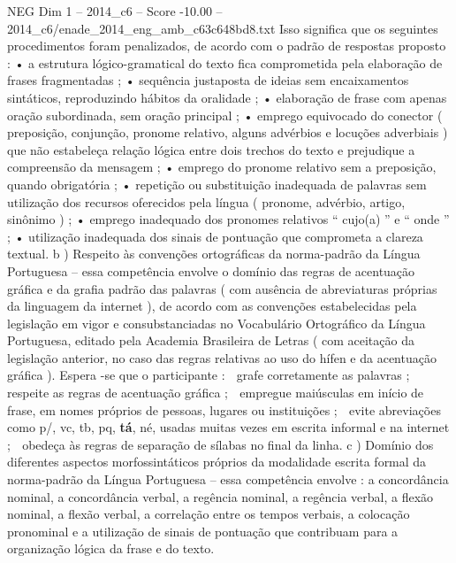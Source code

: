\begin{textsample}{NEG Dim 1 – 2014\_c6 – Score -10.00 – 2014\_c6/enade\_2014\_eng\_amb\_c63c648bd8.txt}
Isso significa que os seguintes procedimentos foram penalizados, de acordo com o padrão de respostas proposto : • a estrutura lógico-gramatical do texto fica comprometida pela elaboração de frases fragmentadas ; • sequência justaposta de ideias sem encaixamentos sintáticos, reproduzindo hábitos da oralidade ; • elaboração de frase com apenas oração subordinada, sem oração principal ; • emprego equivocado do conector ( preposição, conjunção, pronome relativo, alguns advérbios e locuções adverbiais ) que não estabeleça relação lógica entre dois trechos do texto e prejudique a compreensão da mensagem ; • emprego do pronome relativo sem a preposição, quando obrigatória ; • repetição ou substituição inadequada de palavras sem utilização dos recursos oferecidos pela língua ( pronome, advérbio, artigo, sinônimo ) ; • emprego inadequado dos pronomes relativos “ cujo(a) ” e “ onde ” ; • utilização inadequada dos sinais de pontuação que comprometa a clareza textual. b ) Respeito às convenções ortográficas da norma-padrão da Língua Portuguesa – essa competência envolve o domínio das regras de acentuação gráfica e da grafia padrão das palavras ( com ausência de abreviaturas próprias da linguagem da internet ), de acordo com as convenções estabelecidas pela legislação em vigor e consubstanciadas no Vocabulário Ortográfico da Língua Portuguesa, editado pela Academia Brasileira de Letras ( com aceitação da legislação anterior, no caso das regras relativas ao uso do hífen e da acentuação gráfica ).
Espera -se que o participante :  grafe corretamente as palavras ;  respeite as regras de acentuação gráfica ;  empregue maiúsculas em início de frase, em nomes próprios de pessoas, lugares ou instituições ;  evite abreviações como p/, vc, tb, pq, \textbf{tá}, né, usadas muitas vezes em escrita informal e na internet ;  obedeça às regras de separação de sílabas no final da linha. c ) Domínio dos diferentes aspectos morfossintáticos próprios da modalidade escrita formal da norma-padrão da Língua Portuguesa – essa competência envolve : a concordância nominal, a concordância verbal, a regência nominal, a regência verbal, a flexão nominal, a flexão verbal, a correlação entre os tempos verbais, a colocação pronominal e a utilização de sinais de pontuação que contribuam para a organização lógica da frase e do texto.

\end{textsample}
